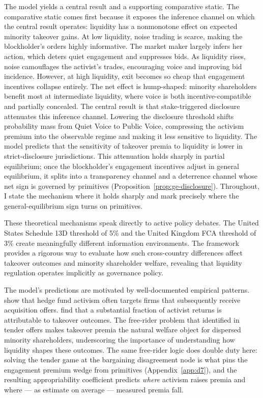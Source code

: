 \documentclass[11pt]{article}
\newcommand{\1}{\mathbf{1}}
\begin{document}
The model yields a central result and a supporting comparative static. The comparative static comes first because it exposes the inference channel on which the central result operates: liquidity has a nonmonotone effect on expected minority takeover gains. At low liquidity, noise trading is scarce, making the blockholder's orders highly informative. The market maker largely infers her action, which deters quiet engagement and suppresses bids. As liquidity rises, noise camouflages the activist's trades, encouraging voice and improving bid incidence. However, at high liquidity, exit becomes so cheap that engagement incentives collapse entirely. The net effect is hump-shaped: minority shareholders benefit most at intermediate liquidity, where voice is both incentive-compatible and partially concealed. The central result is that stake-triggered disclosure attenuates this inference channel. Lowering the disclosure threshold shifts probability mass from Quiet Voice to Public Voice, compressing the activism premium into the observable regime and making it less sensitive to liquidity. The model predicts that the sensitivity of takeover premia to liquidity is lower in strict-disclosure jurisdictions. This attenuation holds sharply in partial equilibrium; once the blockholder's engagement incentives adjust in general equilibrium, it splits into a transparency channel and a deterrence channel whose net sign is governed by primitives (Proposition~\ref{prop:ge-disclosure}). Throughout, I state the mechanism where it holds sharply and mark precisely where the general-equilibrium sign turns on primitives.

These theoretical mechanisms speak directly to active policy debates. The United States Schedule 13D threshold of 5\% and the United Kingdom FCA threshold of 3\% create meaningfully different information environments. The framework provides a rigorous way to evaluate how such cross-country differences affect takeover outcomes and minority shareholder welfare, revealing that liquidity regulation operates implicitly as governance policy.

The model's predictions are motivated by well-documented empirical patterns. \citet{BravJiangPartnoyThomas2008} show that hedge fund activism often targets firms that subsequently receive acquisition offers. \citet{GreenwoodSchor2009} find that a substantial fraction of activist returns is attributable to takeover outcomes. The free-rider problem that \citet{GrossmanHart1980} identified in tender offers makes takeover premia the natural welfare object for dispersed minority shareholders, underscoring the importance of understanding how liquidity shapes these outcomes. The same free-rider logic does double duty here: solving the tender game at the bargaining disagreement node is what pins the engagement premium wedge from primitives (Appendix~\ref{app:d7}), and the resulting appropriability coefficient predicts \emph{where} activism raises premia and where --- as \citet{CelentanoLevine2025} estimate on average --- measured premia fall.
\end{document}
